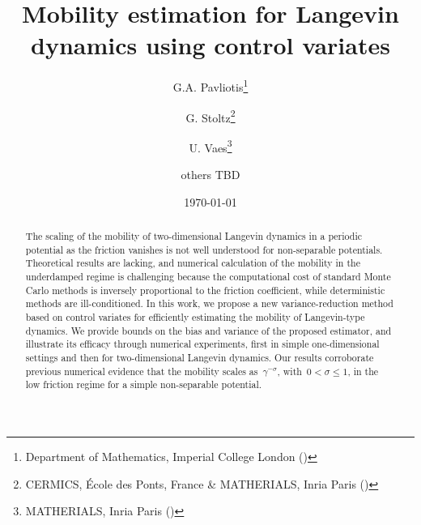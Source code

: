 \documentclass[11pt,a4paper]{article}
\date{\today}
\title{Mobility estimation for Langevin dynamics using control variates}
\author{%
  G.A. Pavliotis\thanks{Department of Mathematics, Imperial College London (\email{g.pavliotis@imperial.ac.uk})}%
  \hspace{2mm}\orcid{0000-0002-3468-9227}%
  \and G. Stoltz\thanks{CERMICS, \'Ecole des Ponts, France \& MATHERIALS, Inria Paris (\email{gabriel.stoltz@enpc.fr})}
  \hspace{2mm}\orcid{0000-0002-2797-5938}%
  \and U. Vaes\thanks{MATHERIALS, Inria Paris (\email{urbain.vaes@inria.fr})}%
  \hspace{2mm}\orcid{0000-0002-7629-7184}
  \and others TBD%
}
\begin{document}
\maketitle

\begin{abstract}
    The scaling of the mobility of two-dimensional Langevin dynamics in a periodic potential as the friction vanishes is not well understood for non-separable potentials.
    Theoretical results are lacking,
    and numerical calculation of the mobility in the underdamped regime is challenging because
    the computational cost of standard Monte Carlo methods is inversely proportional to the friction coefficient,
    while deterministic methods are ill-conditioned.
    In this work, we propose a new variance-reduction method based on control variates for efficiently estimating the mobility of Langevin-type dynamics.
    We provide bounds on the bias and variance of the proposed estimator,
    and illustrate its efficacy through numerical experiments,
    first in simple one-dimensional settings
    and then for two-dimensional Langevin dynamics.
    Our results corroborate previous numerical evidence that
    the mobility scales as~$\gamma^{-\sigma}$, with~$0 < \sigma \leq 1$,
    in the low friction regime for a simple non-separable potential.
\end{abstract}

\end{document}
